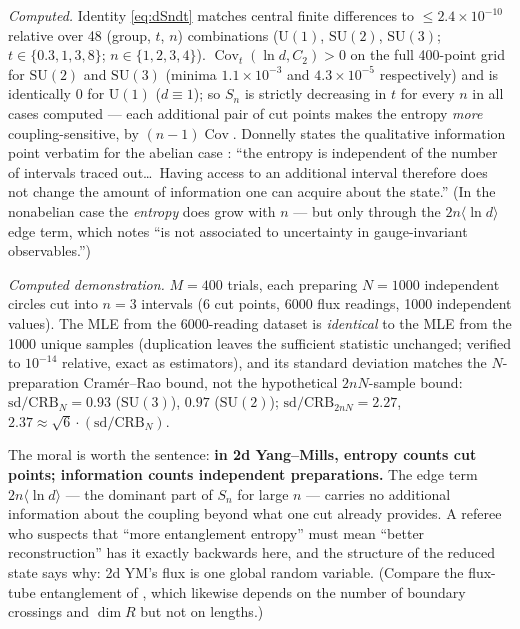 \documentclass[11pt]{article}
\theoremstyle{remark}
\theoremstyle{plain}
\newcommand{\Cov}{\operatorname{Cov}}
\begin{document}
\emph{Computed.} Identity \eqref{eq:dSndt} matches central finite differences to $\leq 2.4\times10^{-10}$ relative over 48 (group, $t$, $n$) combinations ($\mathrm{U}(1)$, $\mathrm{SU}(2)$, $\mathrm{SU}(3)$; $t \in \{0.3, 1, 3, 8\}$; $n \in \{1,2,3,4\}$). $\Cov_t(\ln d, C_2) > 0$ on the full 400-point grid for $\mathrm{SU}(2)$ and $\mathrm{SU}(3)$ (minima $1.1\times10^{-3}$ and $4.3\times10^{-5}$ respectively) and is identically $0$ for $\mathrm{U}(1)$ ($d \equiv 1$); so $S_n$ is strictly decreasing in $t$ for every $n$ in all cases computed --- each additional pair of cut points makes the entropy \emph{more} coupling-sensitive, by $(n-1)\Cov$. Donnelly states the qualitative information point verbatim for the abelian case \cite{D14}: ``the entropy is independent of the number of intervals traced out\dots\ Having access to an additional interval therefore does not change the amount of information one can acquire about the state.'' (In the nonabelian case the \emph{entropy} does grow with $n$ --- but only through the $2n\langle\ln d\rangle$ edge term, which \cite{D14} notes ``is not associated to uncertainty in gauge-invariant observables.'')

\emph{Computed demonstration.} $M = 400$ trials, each preparing $N = 1000$ independent circles cut into $n = 3$ intervals (6 cut points, 6000 flux readings, 1000 independent values). The MLE from the 6000-reading dataset is \emph{identical} to the MLE from the 1000 unique samples (duplication leaves the sufficient statistic unchanged; verified to $10^{-14}$ relative, exact as estimators), and its standard deviation matches the $N$-preparation Cram\'er--Rao bound, not the hypothetical $2nN$-sample bound: $\mathrm{sd}/\mathrm{CRB}_N = 0.93$ ($\mathrm{SU}(3)$), $0.97$ ($\mathrm{SU}(2)$); $\mathrm{sd}/\mathrm{CRB}_{2nN} = 2.27$, $2.37 \approx \sqrt{6}\cdot(\mathrm{sd}/\mathrm{CRB}_N)$.

The moral is worth the sentence: \textbf{in 2d Yang--Mills, entropy counts cut points; information counts independent preparations.} The edge term $2n\langle\ln d\rangle$ --- the dominant part of $S_n$ for large $n$ --- carries no additional information about the coupling beyond what one cut already provides. A referee who suspects that ``more entanglement entropy'' must mean ``better reconstruction'' has it exactly backwards here, and the structure of the reduced state says why: 2d YM's flux is one global random variable. (Compare the flux-tube entanglement of \cite{ASV24}, which likewise depends on the number of boundary crossings and $\dim R$ but not on lengths.)
\end{document}
